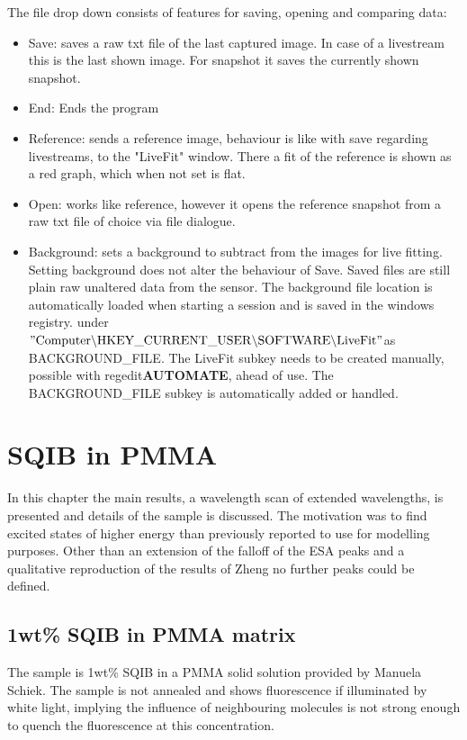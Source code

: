 \documentclass[twoside,openright]{scrreprt}
\begin{document}
{The file drop down consists of features for saving, opening and comparing data:
\begin{itemize}
\item Save: saves a raw txt file of the last captured image. In case of a livestream this is the last shown image. For snapshot it saves the currently shown snapshot.
\item End: Ends the program
\item Reference: sends a reference image, behaviour is like with save regarding livestreams, to the "LiveFit" window. There a fit of the reference is shown as a red graph, which when not set is flat.
\item Open: works like reference, however it opens the reference snapshot from a raw txt file of choice via file dialogue.
\item Background: sets a background to subtract from the images for live fitting. Setting background does not alter the behaviour of Save. Saved files are still plain raw unaltered data from the sensor. The background file location is automatically loaded when starting a session and is saved in the windows registry. under $\mathrm{"Computer \backslash HKEY\_CURRENT\_USER \backslash SOFTWARE \backslash LiveFit"}$as BACKGROUND\_FILE. The LiveFit subkey needs to be created manually, possible with regedit\textbf{AUTOMATE}, ahead of use. The BACKGROUND\_FILE subkey is automatically added or handled.
\end{itemize}


\chapter{SQIB in PMMA}\label{chpt:results}
In this chapter the main results, a wavelength scan of extended wavelengths, is presented and details of the sample is discussed. The motivation was to find excited states of higher energy than previously reported to use for modelling purposes. Other than an extension of the falloff of the ESA peaks and a qualitative reproduction of the results of Zheng\cite{Zheng2020} no further peaks could be defined.

\section{1wt\% SQIB in PMMA matrix}
The sample is 1wt\% SQIB in a PMMA solid solution provided by Manuela Schiek. The sample is not annealed and shows fluorescence if illuminated by white light, implying the influence of neighbouring molecules is not strong enough to quench the fluorescence at this concentration. \\

}
\end{document}
